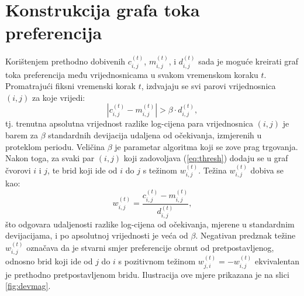 \documentclass[lmodern, utf8, diplomski, numeric]{fer}
\newcommand{\q}{\left}
\newcommand{\w}{\right}
\begin{document}
  \section{Konstrukcija grafa toka preferencija}
  \label{sub:creating-graph}
  Korištenjem prethodno dobivenih $c_{i,j}^{\q(t\w)}$, $m_{i,j}^{\q(t\w)}$, i $d_{i,j}^{\q(t\w)}$ sada je moguće kreirati graf toka preferencija među vrijednosnicama u svakom vremenskom koraku $t$.
  Promatrajući fiksni vremenski korak $t$, izdvajaju se svi parovi vrijednosnica $(i,j)$ za koje vrijedi:
  \begin{equation}
  \label{eq:thresh}
  \q\lvert c_{i,j}^{\q(t\w)} - m_{i,j}^{\q(t\w)} \w\rvert > \beta \cdot d_{i,j}^{\q(t\w)},
  \end{equation}
  tj. trenutna apsolutna vrijednost razlike log-cijena para vrijednosnica $(i,j)$ je barem za $\beta$ standardnih devijacija udaljena od očekivanja, izmjerenih u proteklom periodu.
  Veličina $\beta$ je parametar algoritma koji se zove prag trgovanja.
  Nakon toga, za svaki par $(i,j)$ koji zadovoljava (\ref{eq:thresh}) dodaju se u graf čvorovi $i$ i $j$, te brid koji ide od $i$ do $j$ s težinom $w_{i,j}^{\q(t\w)}$.
  Težina $w_{i,j}^{\q(t\w)}$ dobiva se kao:
  \begin{equation}
  \label{eq:weight}
  w_{i,j}^{\q(t\w)} = \frac{c_{i,j}^{\q(t\w)} - m_{i,j}^{\q(t\w)}}{d_{i,j}^{\q(t\w)}},
  \end{equation}
  što odgovara udaljenosti razlike log-cijena od očekivanja, mjerene u standardnim devijacijama, i po apsolutnoj vrijednosti je veća od $\beta$.
  Negativan predznak težine $w_{i,j}^{\q(t\w)}$ označava da je stvarni smjer preferencije obrnut od pretpostavljenog, odnosno brid koji ide od $j$ do $i$ s pozitivnom težinom $w_{j,i}^{\q(t\w)} = -w_{i,j}^{\q(t\w)}$ ekvivalentan je prethodno pretpostavljenom bridu.
  Ilustracija ove mjere prikazana je na slici \ref{fig:devmag}.
  
\end{document}
